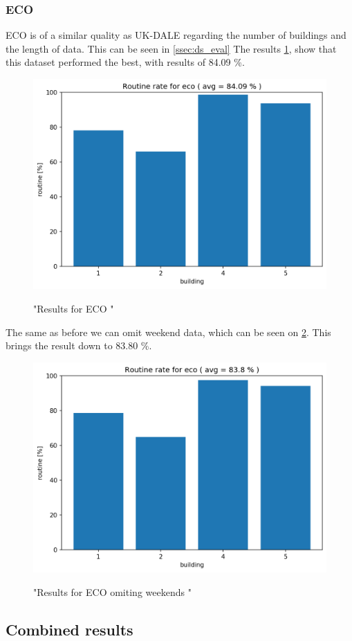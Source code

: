 \subsubsection{ECO}

ECO is of a similar quality as UK-DALE regarding the number of buildings and the length of data.
This can be seen in \ref{ssec:ds_eval}
The results \ref{fig:eco_res}, show that this dataset performed the best, with results of 84.09 \%.

\begin{figure}[H]
	\centering
	\caption{"Results for ECO "}
	\includegraphics[width=.7\textwidth]{Figures/EC/eco_res_nw_1.png}
	\label{fig:eco_res}
\end{figure}

The same as before we can omit weekend data, which can be seen on \ref{fig:eco_res_nw}. This brings the result down to 83.80 \%. 

\begin{figure}[H]
	\centering
	\caption{"Results for ECO omiting weekends "}
	\includegraphics[width=.7\textwidth]{Figures/EC/eco_res.png}
	\label{fig:eco_res_nw}
\end{figure}

\subsection{Combined results}

